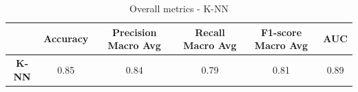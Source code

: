 \begin{table}[H]
    \centering
    \begin{tabular}{cccccc}
        \toprule
        \bf{} & \bf{Accuracy} & \bf{Precision Macro Avg} & \bf{Recall Macro Avg} & \bf{F1-score Macro Avg} & \bf{AUC} \\
        \midrule
        \textbf{K-NN} & 0.85 & 0.84 & 0.79 & 0.81 & 0.89\\
        \bottomrule
    \end{tabular}
    \caption{Overall metrics - K-NN}
    \label{tab:best_model_binary_classification}
\end{table}










